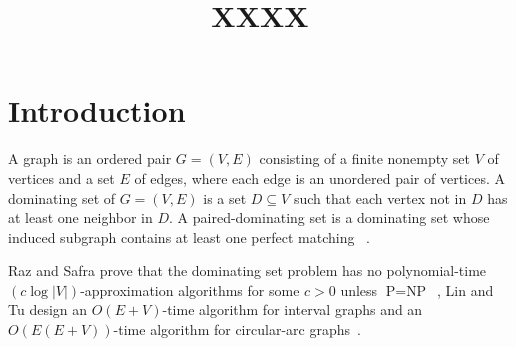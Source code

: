 \documentclass[12pt]{article}
\title{\textbf{XXXX}}
\date{}
\begin{document}
\maketitle

\section{Introduction}
A graph is an ordered pair $G=(V,E)$ consisting of a finite nonempty set $V$ of vertices and a set $E$ of edges, where each edge is an unordered pair of vertices. A dominating set of $G=(V,E)$ is a set $D \subseteq V$ such that each vertex not in $D$ has at least one neighbor in $D$. A paired-dominating set is a dominating set whose induced subgraph contains at least one perfect matching ~\cite{1}.



Raz and Safra prove that the dominating set problem has no polynomial-time $(c \log|V|)$-approximation algorithms for some $c > 0$ unless $\text{P}=\text{NP}$~\cite{2}, Lin and Tu design an $O(E+V)$-time algorithm for interval graphs and an $O(E(E+V))$-time algorithm for circular-arc graphs~\cite {3}.





\end{document}
